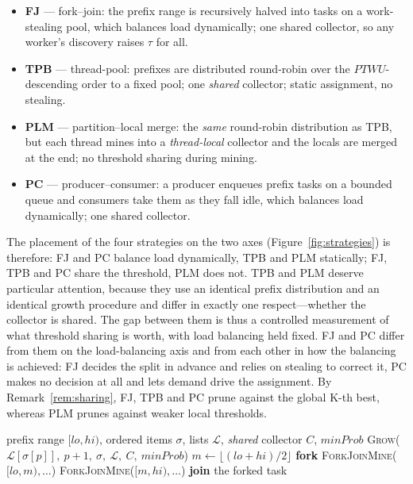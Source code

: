 \documentclass[pdflatex,sn-vancouver-num]{sn-jnl}
\theoremstyle{thmstyleone}%
\theoremstyle{thmstyletwo}%
\theoremstyle{thmstylethree}%
\newcommand{\PTWU}{\mathit{PTWU}}
\newcommand{\minprob}{\mathit{minProb}}
\newcommand{\Kk}{\mathrm{K}}
\begin{document}
\begin{itemize}
\item \textbf{FJ} --- fork--join: the prefix range is recursively halved
into tasks on a work-stealing pool, which balances load dynamically; one
shared collector, so any worker's discovery raises $\tau$ for all.
\item \textbf{TPB} --- thread-pool: prefixes are distributed round-robin
over the $\PTWU$-descending order to a fixed pool; one \emph{shared}
collector; static assignment, no stealing.
\item \textbf{PLM} --- partition--local merge: the \emph{same}
round-robin distribution as TPB, but each thread mines into a
\emph{thread-local} collector and the locals are merged at the end; no
threshold sharing during mining.
\item \textbf{PC} --- producer--consumer: a producer enqueues prefix
tasks on a bounded queue and consumers take them as they fall idle,
which balances load dynamically; one shared collector.
\end{itemize}
 
The placement of the four strategies on the two axes
(Figure~\ref{fig:strategies}) is therefore: FJ and PC balance load
dynamically, TPB and PLM statically; FJ, TPB and PC share the threshold,
PLM does not. TPB and PLM deserve particular attention, because they use
an identical prefix distribution and an identical growth procedure and
differ in exactly one respect---whether the collector is shared. The
gap between them is thus a controlled measurement of what threshold
sharing is worth, with load balancing held fixed. FJ and PC differ from
them on the load-balancing axis and from each other in how the balancing
is achieved: FJ decides the split in advance and relies on stealing to
correct it, PC makes no decision at all and lets demand drive the
assignment. By Remark~\ref{rem:sharing}, FJ, TPB and PC prune against
the global $\Kk$-th best, whereas PLM prunes against weaker local
thresholds.

\begin{algorithm}[t]
\caption{\textsc{ForkJoinMine} (FJ): recursive prefix-batch scheduling}\label{alg:fj}
\begin{algorithmic}[1]
\Require prefix range $[lo,hi)$, ordered items $\sigma$, lists $\mathcal{L}$, \emph{shared} collector $C$, $\minprob$
     \State \textsc{Grow}($\mathcal{L}[\sigma[p]],\ p{+}1,\ \sigma,\ \mathcal{L},\ C,\ \minprob$)
  \EndFor
  \State \Return
\EndIf
\State $m \gets \lfloor (lo+hi)/2 \rfloor$
\State \textbf{fork} \textsc{ForkJoinMine}($[lo,m),\dots$) 
\State \textsc{ForkJoinMine}($[m,hi),\dots$) 
\State \textbf{join} the forked task
\end{algorithmic}
\end{algorithm}
\end{document}
